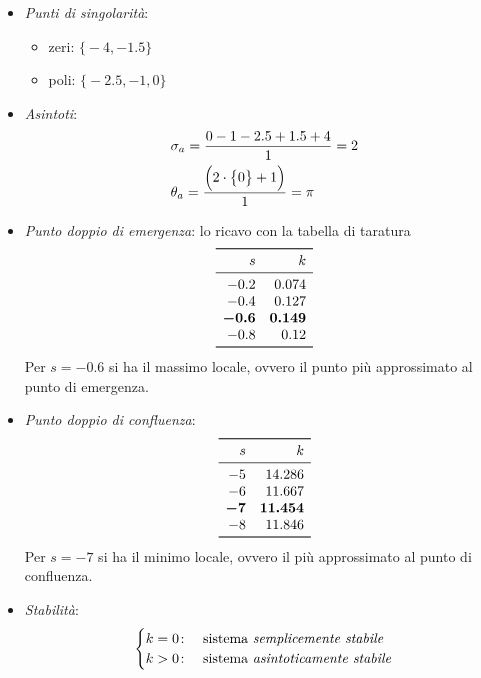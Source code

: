 \begin{esercizio}
\begin{itemize}
	\item \emph{Punti di singolarità}:
		\begin{itemize}
			\item zeri: \(\bigl\{ -4, -1.5 \bigr\}\)
			\item poli: \(\bigl\{ -2.5, -1, 0 \bigr\}\)
		\end{itemize}
	\item \emph{Asintoti}:
		\begin{align*}
			& \sigma_a = \frac{0-1-2.5+1.5+4}{1} = 2 \\
			& \theta_a = \frac{\Bigl( 2 \cdot \bigl\{0\bigr\} +1 \Bigl)}{1} = \pi
		\end{align*}
	\item \emph{Punto doppio di emergenza}:
		lo ricavo con la tabella di taratura
		\[\begin{array}{rr}
			\toprule
			s & k \\
			\midrule
			-0.2 & 0.074 \\
			-0.4 & 0.127 \\
			\bm{-0.6} & \bm{0.149} \\
			-0.8 & 0.12 \\
			\bottomrule
		\end{array}\]
		Per \(s = -0.6\) si ha il massimo locale, ovvero il punto più
		approssimato al punto di emergenza.
	\item \emph{Punto doppio di confluenza}:
		\[\begin{array}{rr}
			\toprule
			s & k \\
			\midrule
			-5 & 14.286 \\
			-6 & 11.667 \\
			\bm{-7} & \bm{11.454} \\
			-8 & 11.846 \\
			\bottomrule
		\end{array}\]
		Per \(s = -7\) si ha il minimo locale, ovvero il più approssimato
		al punto di confluenza.
	\item \emph{Stabilità}:
		\[\begin{cases}
			k = 0\colon & \text{sistema \emph{semplicemente stabile}} \\
			k > 0\colon & \text{sistema \emph{asintoticamente stabile}}
		\end{cases}\]
\end{itemize}
\end{esercizio}

